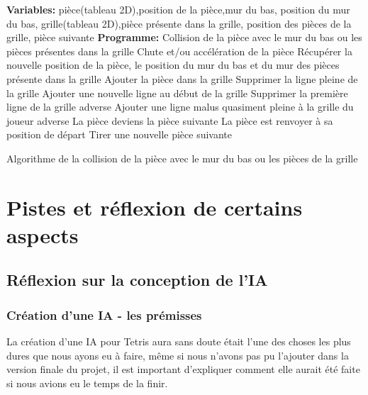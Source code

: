 \documentclass[a4paper, 11pt]{article}
\begin{document}
     		\begin{algorithm}%
     			\centering
     			\begin{algorithmic}[1]
      				\STATE \textbf{Variables:} pièce(tableau 2D),position de la pièce,mur du bas, position du mur du bas, grille(tableau 2D),pièce présente dans la grille, position des pièces de la grille, pièce suivante
      				\STATE \textbf{Programme:} Collision de la pièce avec le mur du bas ou les pièces présentes dans la grille
      				\STATE Chute et/ou accélération de la pièce
      				\STATE Récupérer la nouvelle position de la pièce, le position du mur du bas et du mur des pièces présente 						dans la grille
      						\STATE	Ajouter la pièce dans la grille
      							\STATE Supprimer la ligne pleine de la grille
      							\STATE Ajouter une nouvelle ligne au début de la grille
      								\STATE Supprimer la première ligne de la grille adverse
      								\STATE Ajouter une ligne malus quasiment pleine à la grille du joueur adverse 
      							\ENDIF
      						\ENDIF
      						\STATE La pièce deviens la pièce suivante
      						\STATE La pièce est renvoyer à sa position de départ
      						\STATE Tirer une nouvelle pièce suivante
      					\ENDIF
     			\end{algorithmic}
     			\caption{Algorithme de la collision de la pièce avec le mur du bas ou les pièces de la grille}
     		\end{algorithm}
        \newpage
        \section{Pistes et réflexion de certains aspects}
        \subsection{Réflexion sur la conception de l'IA}
            \subsubsection{Création d'une IA - les prémisses}

                La création d'une IA pour Tetris aura sans doute était l'une des choses les plus dures que nous ayons eu à faire, même si nous n'avons pas pu l'ajouter dans la version finale du projet, il est important d'expliquer comment elle aurait été faite si nous avions eu le temps de la finir.
                
\end{document}
